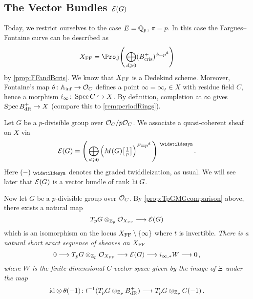 \documentclass[a4paper, 10pt, oneside, DIV=9, chapterprefix=true, numbers=enddot,bibliography=totoc]{scrbook}
\DeclareRobustCommand{\Attention}{\tikz[baseline, anchor=base]\node[draw, regular polygon, regular polygon sides=3, rounded corners=2, thick, inner sep=-0.25pt] at (0,0) {\textbf{!}};}
\begin{document}
\subsection{The Vector Bundles \texorpdfstring{$\mathcal{E}(G)$}{E(G)}}
Today, we restrict ourselves to the case $E=\mathbb{Q}_p$, $\pi=p$. In this case the Fargues--Fontaine curve can be described as
\begin{equation*}
	X_\FFC=\Proj\Bigg(\bigoplus_{d\geq 0}(B_\cris^+)^{\phi=p^d}\Bigg)
\end{equation*}
by \cref{prop:FFandBcris}. We know that $X_{\mathrm{FF}}$ is a Dedekind scheme. Moreover, Fontaine's map $\theta\colon \IA_\inf \morphism \Oo_C$ defines a point $\infty=\infty_t\in X$ with residue field $C$, hence a morphism $i_\infty \colon \Spec C\monomorphism X$. By definition, completion at $\infty$ gives $\Spec B_\dR^+\morphism X$ (compare this to \cref{rem:periodRings}).
\begin{con}
	Let $G$ be a $p$-divisible group over $\mathcal{O}_C/p\mathcal{O}_C$. We associate a quasi-coherent sheaf on $X$ via
	\begin{equation*}
		\Ee(G)=\Bigg(\bigoplus_{d\geq 0}\left(M(G)\localize{p}\right)^{F=p^d}\Bigg)^\qcmod\,.
	\end{equation*}
	Here $(-)^\qcmod$ denotes the graded twiddleization, as usual. We will see later that $\mathcal{E}(G)$ is a vector bundle of rank $\operatorname{ht} G$.
\end{con}
Now let $G$ be a $p$-divisible group over $\mathcal{O}_C$. By \cref{prop:TpGMGcomparison} above, there exists a natural map
\begin{equation*}
	T_pG\otimes_{\IZ_p} \Oo_{X_\FFC}\morphism \Ee(G)
\end{equation*}
which is an isomorphism on the locus $X_{\mathrm{FF}}\setminus \{\infty\}$ where $t$ is invertible.
\numpar{Corollary \smash{\Attention}}\label{cor:E(G)SES} \itshape There is a natural short exact sequence of sheaves on $X_{\mathrm{FF}}$
	\begin{equation*}
		0\morphism T_pG\otimes_{\IZ_p} \Oo_{X_\FFC}\morphism\Ee(G)\morphism i_{\infty,*}W\morphism 0\,,
	\end{equation*}
	where $W$ is the finite-dimensional $C$-vector space given by the image of $\Xi$ under the map\upshape
	\begin{equation*}
		{\id}\otimes {\theta(-1)}\colon t^{-1}(T_pG\otimes_{\IZ_p}B_\dR^+)\morphism T_pG\otimes_{\IZ_p}C(-1)\,.
	\end{equation*}
\end{document}
